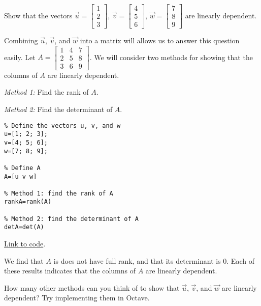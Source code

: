 \documentclass{ximera}
\begin{document}
\begin{example}\label{ex:vecsToMatrix}
    Show that the vectors $\vec{u}=\begin{bmatrix}1\\2\\3\end{bmatrix}$, $\vec{v}=\begin{bmatrix}4\\5\\6\end{bmatrix}$, $\vec{w}=\begin{bmatrix}7\\8\\9\end{bmatrix}$ are linearly dependent.
    \begin{explanation}
        Combining $\vec{u}$, $\vec{v}$, and $\vec{w}$ into a matrix will allows us to answer this question easily.  Let $A=\begin{bmatrix}1 & 4 &7\\2 & 5 & 8\\3 & 6 & 9\end{bmatrix}$.  We will consider two methods for showing that the columns of $A$ are linearly dependent.

        \emph{Method 1:} Find the rank of $A$.
        
        \emph{Method 2:} Find the determinant of $A$.

        \begin{verbatim}
% Define the vectors u, v, and w
u=[1; 2; 3];
v=[4; 5; 6];
w=[7; 8; 9];

% Define A
A=[u v w]

% Method 1: find the rank of A
rankA=rank(A)

% Method 2: find the determinant of A
detA=det(A)
        \end{verbatim}
        
\href{https://sagecell.sagemath.org/?z=eJxVjTsKwzAQRHuB7jCNIQE3dv5ZVAjS5gTChYnW2JhI4Mjy9SPlA0kz7OzOmy1w4W5wjNAzIt-Cnx6YS8QSrbNYpJiVqQg1YdOQFFGZLWFH2Ge3KHMgHAmn7KQovm1aCq3MjIileR-uHHpvUZ2RAvb1bmrdCN_lcB61yrrS6z-g_gEsB57ug2td-HBpo1WSRD0Bo444Hw==&lang=octave&interacts=eJyLjgUAARUAuQ==}{Link to code}.  

We find that $A$ is does not have full rank, and that its determinant is $0$.  Each of these results indicates that the columns of $A$ are linearly dependent.
\end{explanation}

How many other methods can you think of to show that $\vec{u}$, $\vec{v}$, and $\vec{w}$ are linearly dependent?  Try implementing them in Octave.
\end{example}
\end{document}
